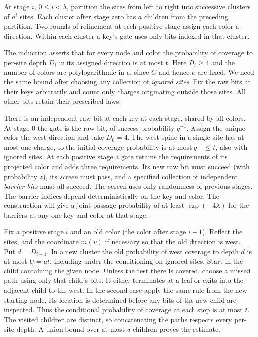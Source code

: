 At stage \(i\), \(0\le i<h\), partition the sites from left to right
into successive clusters of \(a^i\) sites. Each cluster after stage
zero has \(a\) children from the preceding partition. Two rounds of
refinement at each positive stage assign each color a direction.
Within each cluster a key's gate uses only bits indexed in that cluster.

The induction asserts that for every node and color the probability of
coverage to per-site depth \(D_i\) in its assigned direction is at most
\(t\). Here \(D_i\ge4\) and the number of colors are polylogarithmic
in \(a\), since \(C\) and hence \(h\) are fixed. We need the same bound
after choosing any collection of \emph{ignored sites}. Fix the raw
bits at their keys arbitrarily and count only charges originating
outside those sites. All other bits retain their prescribed laws.

There is an independent raw bit at each key at each stage, shared by all
colors. At stage $0$ the gate is the raw bit, of success probability
$q^{-1}$. Assign the unique color the west direction and take $D_0=4$.
The west spine in a single site has at most one charge, so the initial
coverage probability is at most $q^{-1}\le t$, also with ignored sites.
At each positive stage a gate retains the requirements of its projected
color and adds three requirements. Its new raw bit must succeed (with
probability $z$), its \emph{screen} must pass, and a specified collection
of independent \emph{barrier bits} must all succeed. The screen uses
only randomness of previous stages. The barrier indices depend
deterministically on the key and color. The construction will give a
joint passage probability of at least $\exp(-4\lambda)$ for the
barriers at any one key and color at that stage.

Fix a positive stage $i$ and an old color (the color after stage $i-1$).
Reflect the sites, and the coordinate $m(v)$ if necessary
so that the old direction is west. Put \(d=D_{i-1}\). In a new cluster the old probability of west
coverage to depth \(d\) is at most \(U=at\), including under the
conditioning on ignored sites. Start in the child containing the
given node. Unless the test there is covered, choose a missed path
using only that child's bits. It either terminates at a leaf or exits
into the adjacent child to the west. In the second case apply the
same rule from the new starting node. Its location is determined
before any bits of the new child are inspected. Thus the conditional
probability of coverage at each step is at most \(t\). The visited
children are distinct, so concatenating the paths respects every
per-site depth. A union bound over at most \(a\) children proves
the estimate.

